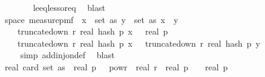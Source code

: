 \begin{isabellebody}
\ \ \ \ \ \ \ \ \ \ \isamarkupfalse%
\ le{\isacharunderscore}{\kern0pt}eq{\isacharunderscore}{\kern0pt}less{\isacharunderscore}{\kern0pt}or{\isacharunderscore}{\kern0pt}eq\ \isamarkupfalse%
\ blast\isanewline
\ \ \ \ \ \ \isamarkupfalse%
\isanewline
\ \ \ \ \ \isamarkupfalse%
\ \isamarkupfalse%
\ {\isachardoublequoteopen}{\isasymomega}\ {\isasymin}\ {\isacharbraceleft}{\kern0pt}{\isasymomega}\ {\isasymin}\ space\ {\isacharparenleft}{\kern0pt}measure{\isacharunderscore}{\kern0pt}pmf\ {\isasymOmega}\ {\isasymexists}x\ {\isasymin}\ set\ as{\isachardot}{\kern0pt}\ {\isasymexists}y\ {\isasymin}\ set\ as{\isachardot}{\kern0pt}\ x\ {\isasymnoteq}\ y\ {\isasymand}\isanewline
\ \ \ \ \ \ \ \ truncate{\isacharunderscore}{\kern0pt}down\ r\ {\isacharparenleft}{\kern0pt}real\ {\isacharparenleft}{\kern0pt}hash\ p\ x\ {\isasymomega}{\isacharparenright}{\kern0pt}{\isacharparenright}{\kern0pt}\ {\isasymle}\ real\ p\ {\isasymand}\ \isanewline
\ \ \ \ \ \ \ \ truncate{\isacharunderscore}{\kern0pt}down\ r\ {\isacharparenleft}{\kern0pt}real\ {\isacharparenleft}{\kern0pt}hash\ p\ x\ {\isasymomega}{\isacharparenright}{\kern0pt}{\isacharparenright}{\kern0pt}\ {\isacharequal}{\kern0pt}\ truncate{\isacharunderscore}{\kern0pt}down\ r\ {\isacharparenleft}{\kern0pt}real\ {\isacharparenleft}{\kern0pt}hash\ p\ y\ {\isasymomega}{\isacharparenright}{\kern0pt}{\isacharparenright}{\kern0pt}{\isacharbraceright}{\kern0pt}{\isachardoublequoteclose}\isanewline
\ \ \ \ \ \ \ \isamarkupfalse%
\ {\isacharparenleft}{\kern0pt}simp\ add{\isacharcolon}{\kern0pt}inj{\isacharunderscore}{\kern0pt}on{\isacharunderscore}{\kern0pt}def{\isacharparenright}{\kern0pt}\ \isamarkupfalse%
\ blast\isanewline
\ \ \ \ \isamarkupfalse%
\isanewline
\ \ \ \ \isamarkupfalse%
\ \isamarkupfalse%
\ {\isachardoublequoteopen}{\isachardot}{\kern0pt}{\isachardot}{\kern0pt}{\isachardot}{\kern0pt}\ {\isasymle}\ {}\ {\isacharasterisk}{\kern0pt}\ {\isacharparenleft}{\kern0pt}real\ {\isacharparenleft}{\kern0pt}card\ {\isacharparenleft}{\kern0pt}set\ as{\isacharparenright}{\kern0pt}{\isacharparenright}{\kern0pt}{\isacharparenright}{\kern0pt}\ {\isacharasterisk}{\kern0pt}\ {\isacharparenleft}{\kern0pt}real\ p{\isacharparenright}{\kern0pt}\ {\isacharasterisk}{\kern0pt}\ {}\ powr\ {\isacharminus}{\kern0pt}\ real\ r\ {\isacharslash}{\kern0pt}\ {\isacharparenleft}{\kern0pt}real\ p{\isacharparenright}{\kern0pt}\ {\isacharplus}{\kern0pt}\ {}\ {\isacharslash}{\kern0pt}\ real\ p{\isachardoublequoteclose}\isanewline

\end{isabellebody}
